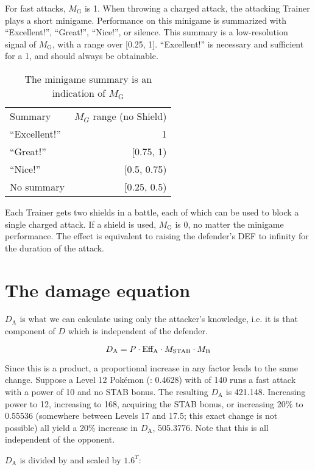 For fast attacks, $M_\mathrm{G}$ is 1.
When throwing a charged attack, the attacking Trainer plays a short minigame.
Performance on this minigame is summarized with ``Excellent!'', ``Great!'',
``Nice!'', or silence.
This summary is a low-resolution signal of $M_\mathrm{G}$, with a range over [0.25, 1].
``Excellent!'' is necessary and sufficient for a 1, and should always be obtainable.
\begin{table}
\centering
\begin{tabular}{l r}
Summary & $M_G$ range (no Shield) \\
\Midrule
``Excellent!'' & 1 \\
``Great!'' & [0.75, 1) \\
``Nice!'' & [0.5, 0.75) \\
No summary & [0.25, 0.5) \\
\end{tabular}
\caption{The minigame summary is an indication of $M_\mathrm{G}$}
\end{table}
Each Trainer gets two shields in a battle, each of which can be used
 to block a single charged attack.
If a shield is used, $M_\mathrm{G}$ is 0, no matter the minigame performance.
The effect is equivalent to raising the defender's DEF to infinity for the
  duration of the attack.

\section{The damage equation\label{sec:damage}}

$D_\mathrm{A}$ is what we can calculate using only the attacker's knowledge, i.e.
 it is that component of $D$ which is independent of the defender.

\[ D_\mathrm{A} = P \cdot \mbox{$\text{Eff}_\text{A}$} \cdot M_\mathrm{STAB} \cdot M_\mathrm{B} \]

Since this is a product, a proportional increase in any factor leads to
 the same change.
Suppose a Level 12 Pokémon (\CPM: 0.4628) with  of 140 runs
  a fast attack with a power of 10 and no STAB bonus.
The resulting $D_\mathrm{A}$ is 421.148.
Increasing power to 12,
 increasing  to 168,
 acquiring the STAB bonus,
 or increasing \CPM{} 20\% to 0.55536 (somewhere between Levels 17 and 17.5; this exact change is not possible)
 all yield a 20\% increase in $D_\mathrm{A}$, 505.3776.
Note that this is all independent of the opponent.

$D_\mathrm{A}$ is divided by  and scaled by $1.6^T$:

